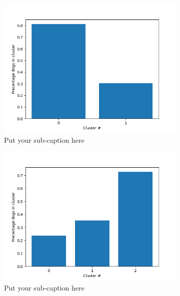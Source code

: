 \documentclass{article}
\begin{document}
\begin{figure}[ht]
\begin{subfigure}{.33\textwidth}
  \centering
  \includegraphics[width=1\linewidth]{1c/label overlapp 2 clusters.png}  
  \caption{Put your sub-caption here}
  \label{fig:sub-first}
\end{subfigure}
\begin{subfigure}{.33\textwidth}
  \centering
  \includegraphics[width=1\linewidth]{1c/label overlapp 3 clusters.png}  
  \caption{Put your sub-caption here}
  \label{fig:sub-second}
\end{subfigure}
\begin{subfigure}{.33\textwidth}

\end{subfigure}
\end{figure}
\end{document}
